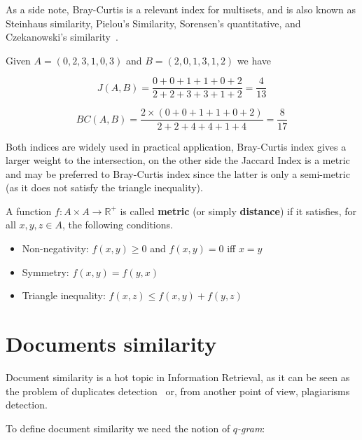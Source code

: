 As a side note, Bray-Curtis is a relevant index for multisets, and is also known as Steinhaus similarity, Pielou's Similarity, Sorensen's quantitative, and Czekanowski's similarity~\cite{legendre1998numerical}.

\begin{esempio}
	Given $A = (0, 2, 3, 1, 0, 3) $ and $B = (2, 0, 1, 3, 1, 2)$ we have
	
	\begin{equation}
	J(A,B) = \frac{0 + 0 + 1 + 1 + 0 + 2}{2 + 2 + 3 + 3 + 1 + 2} = \frac{4}{13} 
	\end{equation}
	
	\begin{equation}
	BC(A,B) = \frac{2 \times (0 + 0 + 1 + 1 + 0 + 2) }{2 + 2 + 4 + 4 + 1 + 4} = \frac{8}{17}
	\end{equation}
\end{esempio}

Both indices are widely used in practical application, Bray-Curtis index gives a larger weight to the intersection, on the other side the Jaccard Index is a metric and may be preferred to Bray-Curtis index since the latter is only a semi-metric (as it does not satisfy the triangle inequality). 

\begin{definizione}
	A function $f : A \times A \rightarrow \mathbb{R}^{+} $ is called \textbf{metric} (or simply \textbf{distance}) if it satisfies, for all $x, y, z \in A$, the following conditions.
	\begin{itemize}
		\item Non-negativity: $f(x,y) \geq 0$ and $f(x,y) = 0$ iff $x = y$
		\item Symmetry: $f(x, y) = f(y, x)$
		\item Triangle inequality: $f(x, z) \leq f(x, y) + f(y, z)$
	\end{itemize}
\end{definizione}

\section{Documents similarity}

Document similarity is a hot topic in Information Retrieval, as it can be seen as the problem of duplicates detection~\cite{Broder2000} or, from another point of view, plagiarisms detection.\bigskip

To define document similarity we need the notion of \textit{$q$-gram}:

